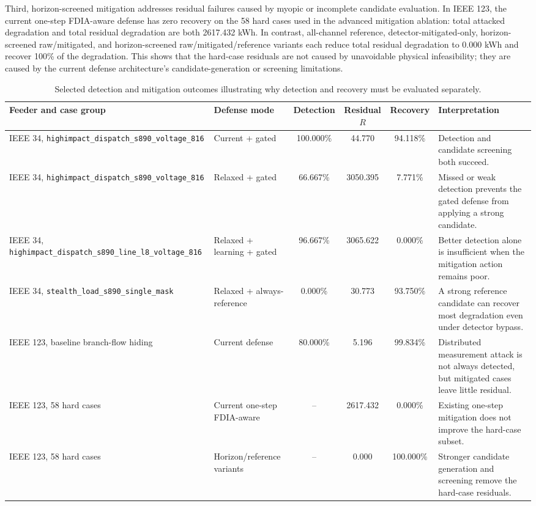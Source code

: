 Third, horizon-screened mitigation addresses residual failures caused by myopic or incomplete candidate evaluation. In IEEE 123, the current one-step FDIA-aware defense has zero recovery on the 58 hard cases used in the advanced mitigation ablation: total attacked degradation and total residual degradation are both 2617.432 kWh. In contrast, all-channel reference, detector-mitigated-only, horizon-screened raw/mitigated, and horizon-screened raw/mitigated/reference variants each reduce total residual degradation to 0.000 kWh and recover 100\% of the degradation. This shows that the hard-case residuals are not caused by unavoidable physical infeasibility; they are caused by the current defense architecture's candidate-generation or screening limitations.

\begin{table}[t]
\centering
\caption{Selected detection and mitigation outcomes illustrating why detection and recovery must be evaluated separately.}
\label{tab:detection_mitigation_analysis}
\scriptsize
\begin{tabular}{llcccp{4.0cm}}
\hline
Feeder and case group & Defense mode & Detection & Residual $R$ & Recovery & Interpretation \\
\hline
IEEE 34, \texttt{highimpact\_dispatch\_s890\_voltage\_816} & Current + gated & 100.000\% & 44.770 & 94.118\% & Detection and candidate screening both succeed. \\
IEEE 34, \texttt{highimpact\_dispatch\_s890\_voltage\_816} & Relaxed + gated & 66.667\% & 3050.395 & 7.771\% & Missed or weak detection prevents the gated defense from applying a strong candidate. \\
IEEE 34, \texttt{highimpact\_dispatch\_s890\_line\_l8\_voltage\_816} & Relaxed + learning + gated & 96.667\% & 3065.622 & 0.000\% & Better detection alone is insufficient when the mitigation action remains poor. \\
IEEE 34, \texttt{stealth\_load\_s890\_single\_mask} & Relaxed + always-reference & 0.000\% & 30.773 & 93.750\% & A strong reference candidate can recover most degradation even under detector bypass. \\
IEEE 123, baseline branch-flow hiding & Current defense & 80.000\% & 5.196 & 99.834\% & Distributed measurement attack is not always detected, but mitigated cases leave little residual. \\
IEEE 123, 58 hard cases & Current one-step FDIA-aware & -- & 2617.432 & 0.000\% & Existing one-step mitigation does not improve the hard-case subset. \\
IEEE 123, 58 hard cases & Horizon/reference variants & -- & 0.000 & 100.000\% & Stronger candidate generation and screening remove the hard-case residuals. \\
\hline
\end{tabular}
\end{table}

